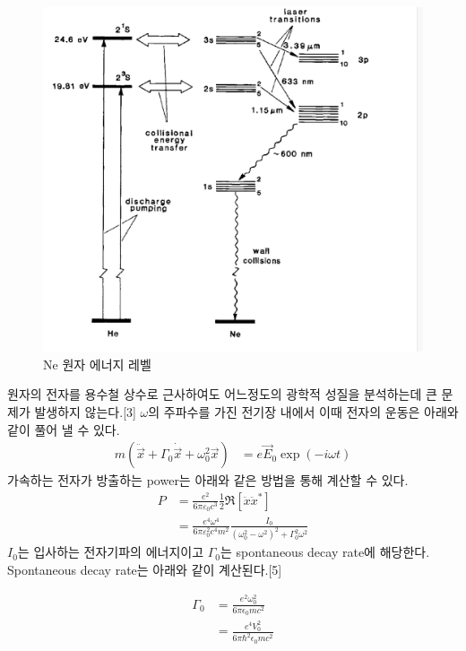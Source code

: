 \documentclass[%
 reprint,
 amsmath,amssymb,
 aps,
]{revtex4-2}
\begin{document}
\begin{figure}[htbp]
	\includegraphics[width = 0.85\linewidth]{Neenergy.png}%
	\caption{\label{fig:Neenergy}Ne 원자 에너지 레벨}
\end{figure}

원자의 전자를 용수철 상수로 근사하여도 어느정도의 광학적 성질을 분석하는데 큰 문제가 발생하지 않는다.[3] $\omega$의 주파수를 가진 전기장 내에서 이때 전자의 운동은 아래와 같이 풀어 낼 수 있다.
\begin{align}
	m(\ddot{\vec{x}}+\Gamma_{0}\dot{\vec{x}} + \omega_{0}^{2}\vec{x}) &= e\vec{E}_{0}\exp(-i\omega t)
\end{align}
가속하는 전자가 방출하는 power는 아래와 같은 방법을 통해 계산할 수 있다.
\begin{align}
	P &= \frac{e^{2}}{6\pi\varepsilon_{0}c^{3}}\frac{1}{2}\Re[\ddot{x}\ddot{x}^{*}]\\
	&= \frac{e^{4}\omega^{4}}{6\pi\varepsilon_{0}^{2}c^{4}m^{2}} \frac{I_{0}}{(\omega_{0}^{2}-\omega^{2})^{2}+\Gamma_{0}^{2}\omega^{2}}
\end{align}
$I_{0}$는 입사하는 전자기파의 에너지이고 $\Gamma_{0}$는 spontaneous decay rate에 해당한다. Spontaneous decay rate는 아래와 같이 계산된다.[5]

\begin{align}
	\Gamma_{0} &= \frac{e^{2}\omega_{0}^{2}}{6\pi \epsilon_{0}mc^{2}}\\
	&= \frac{e^{4}V_{0}^{2}}{6\pi \hbar^{2}\epsilon_{0}mc^{2}} \label{eq:theorydecay}
\end{align}
\end{document}
